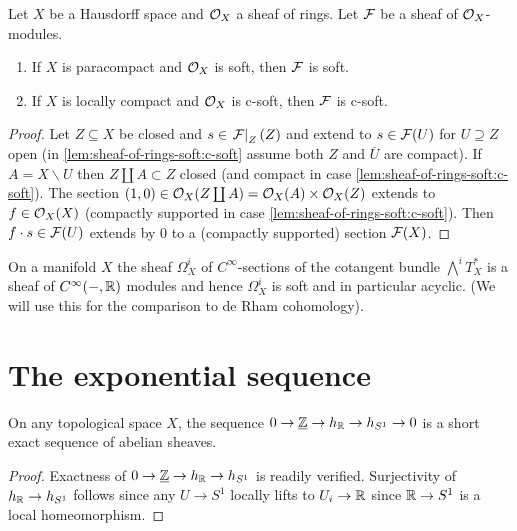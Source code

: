 \documentclass[../main.tex]{subfiles}
\begin{document}
\begin{lem}
    Let $X$ be a Hausdorff space and $\mathcal{O}_X$ a sheaf of rings. Let $\mathcal{F}$ be a sheaf of $\mathcal{O}_X$-modules.
    \begin{enumerate}
        \item\label{lem:sheaf-of-rings-soft:soft} If $X$ is paracompact and $\mathcal{O}_X$ is soft, then $\mathcal{F}$ is soft.
        \item\label{lem:sheaf-of-rings-soft:c-soft} If $X$ is locally compact and $\mathcal{O}_X$ is c-soft, then $\mathcal{F}$ is c-soft.
    \end{enumerate}
\end{lem}
\begin{proof}
    Let $Z\subseteq X$ be closed and $s\in \left.\mathcal{F}\right|_{Z}(Z)$ and extend to $s\in \mathcal{F}(U)$ for $U\supseteq Z$ open (in \cref{lem:sheaf-of-rings-soft:c-soft} assume both $Z$ and $\overline{U}$ are compact). If $A = X\backslash U$ then $Z \coprod A \subset Z$ closed (and compact in case \cref{lem:sheaf-of-rings-soft:c-soft}). The section $(1,0) \in \mathcal{O}_X(Z\coprod A) = \mathcal{O}_X(A)\times \mathcal{O}_X(Z)$ extends to $f\in \mathcal{O}_X(X)$ (compactly supported in case \cref{lem:sheaf-of-rings-soft:c-soft}). Then $f\cdot s \in \mathcal{F}(U)$ extends by $0$ to a (compactly supported) section $\mathcal{F}(X)$. 
\end{proof}

\begin{exmp}
    On a manifold $X$ the sheaf $\Omega^i_X$ of $C^\infty$-sections of the cotangent bundle $\bigwedge^i T_X^*$ is a sheaf of $C^\infty(-, \mathbb{R})$ modules and hence $\Omega_X^i$ is soft and in particular acyclic. (We will use this for the comparison to de Rham cohomology).
\end{exmp}

\section{The exponential sequence}

\begin{lem}\label{lem:exponential-sequence}
On any topological space \(X\), the sequence $0\to \underline{\mathbb{Z}} \to h_{\mathbb{R}}\to h_{S^1} \to 0$ is a short exact sequence of abelian sheaves.
\end{lem}
\begin{proof}
Exactness of $0\to \underline{\mathbb{Z}}\to h_{\mathbb{R}}\to h_{S^1}$ is readily verified. Surjectivity of $h_{\mathbb{R}}\to h_{S^1}$ follows since any $U\to S^1$ locally lifts to $U_i\to \mathbb{R}$ since $\mathbb{R}\to S^1$ is a local homeomorphism.
\end{proof}
\end{document}
